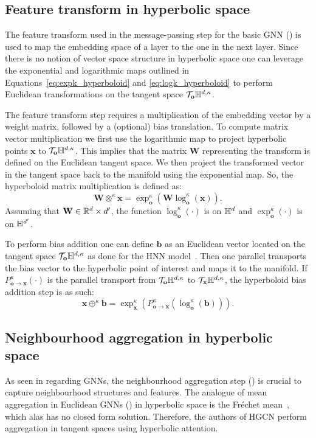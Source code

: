 \subsection{Feature transform in hyperbolic space}
The feature transform used in the message-passing step for the basic GNN () is used to map the embedding space of a layer to the one in the next layer. Since there is no notion of vector space structure in hyperbolic space one can leverage the exponential and logarithmic maps outlined in Equations~\eqref{eq:expk_hyperboloid} and \eqref{eq:logk_hyperboloid} to perform Euclidean transformations on the tangent space $\mathcal{T}_\mathbf{o}\mathbb{H}^{d,\kappa}$. 

The feature transform step requires a multiplication of the embedding vector by a weight matrix, followed by a (optional) bias translation. To compute matrix vector multiplication we first use the logarithmic map to project hyperbolic points $\mathbf{x}$ to $\mathcal{T}_\mathbf{o}\mathbb{H}^{d,\kappa}$. This implies that the matrix $\mathbf{W}$ representing the transform is defined on the Euclidean tangent space. We then project the transformed vector in the tangent space back to the manifold using the exponential map. So, the hyperboloid matrix multiplication is defined as:
\begin{equation*}
    \mathbf{W} \otimes^\kappa \mathbf{x} = \exp_{\mathbf{o}}^\kappa\left(\mathbf{W}\log_{\mathbf{o}}^\kappa(\mathbf{x})\right).
\end{equation*}
Assuming that $\mathbf{W} \in \mathbb{R}^{d}\times d'$, the function $\log_{\mathbf{o}}^\kappa(\cdot)$ is on $\mathbb{H}^{d}$ and $\exp_{\mathbf{o}}^\kappa(\cdot)$ is on $\mathbb{H}^{d'}$. 

To perform bias addition one can define $\mathbf{b}$ as an Euclidean vector located on the tangent space $\mathcal{T}_\mathbf{o}\mathbb{H}^{d,\kappa}$ as done for the HNN model~\cite{ganea2018HNN}. Then one parallel transports the bias vector to the hyperbolic point of interest and maps it to the manifold. If $P_{\mathbf{o}\to \mathbf{x}}^\kappa (\cdot)$ is the parallel transport from $\mathcal{T}_\mathbf{o}\mathbb{H}^{d,\kappa}$ to $\mathcal{T}_{\mathbf{x}}\mathbb{H}^{d,\kappa}$, the hyperboloid bias addition step is as such:
\begin{equation*}
    \mathbf{x} \oplus^\kappa \mathbf{b} = \exp_{\mathbf{x}}^\kappa\left(P_{\mathbf{o}\to \mathbf{x}}^\kappa\left(\log_{\mathbf{o}}^\kappa(\mathbf{b})\right)\right).
\end{equation*}

\subsection{Neighbourhood aggregation in hyperbolic space}\label{sec:hgcnAggregation}
As seen in  regarding GNNs, the neighbourhood aggregation step () is crucial to capture neighbourhood structures and features. The analogue of mean aggregation in Euclidean GNNs () in hyperbolic space is the Fréchet mean~\cite{frechet1948elements}, which alas has no closed form solution. Therefore, the authors of HGCN perform aggregation in tangent spaces using hyperbolic attention.

